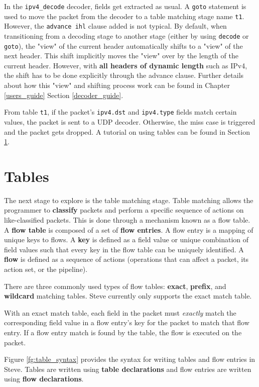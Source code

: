 In the \texttt{ipv4\_decode} decoder, fields get extracted as usual. A \texttt{goto} statement is used to move the packet from the decoder to a table matching stage name \texttt{t1}. However, the \texttt{advance ihl} clause added is not typical. By default, when transitioning from a decoding stage to another stage (either by using \texttt{decode} or \texttt{goto}), the "view" of the current header automatically shifts to a "view" of the next header. This shift implicitly moves the "view" over by the length of the current header. However, with \textbf{all headers of dynamic length} such as IPv4, the shift has to be done explicitly through the advance clause. Further details about how this "view" and shifting process work can be found in Chapter \ref{users_guide} Section \ref{decoder_guide}.

From table \texttt{t1}, if the packet's \texttt{ipv4.dst} and \texttt{ipv4.type} fields match certain values, the packet is sent to a UDP decoder. Otherwise, the miss case is triggered and the packet gets dropped. A tutorial on using tables can be found in Section \ref{table_tut}. 

\section{Tables} \label{table_tut}

The next stage to explore is the table matching stage. Table matching allows the programmer to \textbf{classify} packets and perform a specific sequence of actions on like-classified packets. This is done through a mechanism known as a flow table. A \textbf{flow table} is composed of a set of \textbf{flow entries}. A flow entry is a mapping of unique keys to flows. A \textbf{key} is defined as a field value or unique combination of field values such that every key in the flow table can be uniquely identified. A \textbf{flow} is defined as a sequence of actions (operations that can affect a packet, its action set, or the pipeline).

There are three commonly used types of flow tables: \textbf{exact}, \textbf{prefix}, and \textbf{wildcard} matching tables. Steve currently only supports the exact match table. 

With an exact match table, each field in the packet must \textit{exactly} match the corresponding field value in a flow entry's key for the packet to match that flow entry. If a flow entry match is found by the table, the flow is executed on the packet.

Figure \ref{fg:table_syntax} provides the syntax for writing tables and flow entries in Steve. Tables are written using \textbf{table declarations} and flow entries are written using \textbf{flow declarations}.

